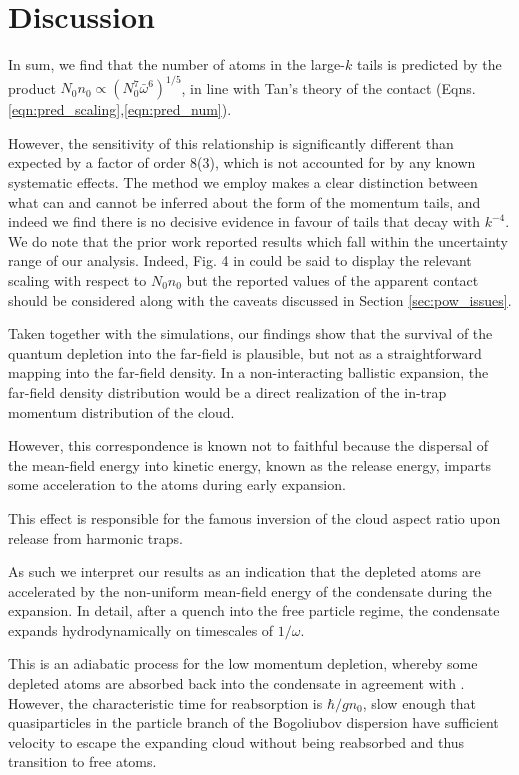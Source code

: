 \section{Discussion}
\label{sec:discussion}

	In sum, we find that the number of atoms in the large-$k$ tails is predicted by the product $N_0n_0\propto(N_{0}^7\bar{\omega}^6)^{1/5}$, in line with Tan's theory of the contact (Eqns.
	\ref{eqn:pred_scaling},\ref{eqn:pred_num}).
	
	However, the sensitivity of this relationship is significantly different than expected by a factor of order 8(3), which is not accounted for by any known systematic effects.
	The method we employ makes a clear distinction between what can and cannot be inferred about the form of the momentum tails, and indeed we find there is no decisive evidence in favour of tails that decay with $k^{-4}$.
	We do note that the prior work \cite{Chang16} reported results which fall within the uncertainty range of our analysis.
	Indeed, Fig.
	4 in \cite{Chang16} could be said to display the relevant scaling with respect to $N_0n_0$ but the reported values of the apparent contact should be considered along with the caveats discussed in Section \ref{sec:pow_issues}.
	
	Taken together with the simulations, our findings show that the survival of the quantum depletion into the far-field is plausible, but not as a straightforward mapping into the far-field density.
	In a non-interacting ballistic expansion, the far-field density distribution would be a direct realization of the in-trap momentum distribution of the cloud.
	
	However, this correspondence is known not to faithful because the dispersal of the mean-field energy into kinetic energy, known as the release energy, imparts some acceleration to the atoms during early expansion.
	
	This effect is responsible for the famous inversion of the cloud aspect ratio upon release from harmonic traps.
	

	As such we interpret our results as an indication that the depleted atoms are accelerated by the non-uniform mean-field energy of the condensate during the expansion.
	In detail, after a quench into the free particle regime, the condensate expands hydrodynamically on timescales of $1/\omega$.
	
	This is an adiabatic process for the low momentum depletion, whereby some depleted atoms are absorbed back into the condensate in agreement with \cite{Qu16}.
	However, the characteristic time for reabsorption is $\hbar/gn_0$, slow enough that quasiparticles in the particle branch of the Bogoliubov dispersion have sufficient velocity to escape the expanding cloud without being reabsorbed and thus transition to free atoms.
	
